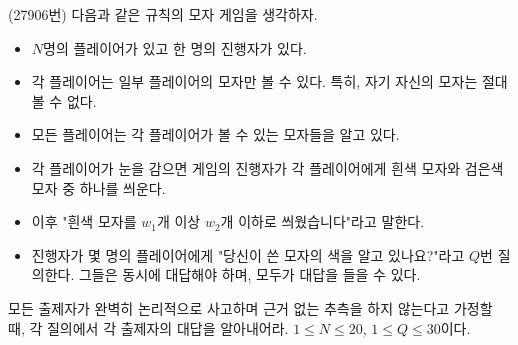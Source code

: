 \begin{problem}
    (27906번) 다음과 같은 규칙의 모자 게임을 생각하자.
    \begin{itemize}
        \item $N$명의 플레이어가 있고 한 명의 진행자가 있다. 
        \item 각 플레이어는 일부 플레이어의 모자만 볼 수 있다. 특히, 자기 자신의 모자는 절대 볼 수 없다.
        \item 모든 플레이어는 각 플레이어가 볼 수 있는 모자들을 알고 있다.
        \item 각 플레이어가 눈을 감으면 게임의 진행자가 각 플레이어에게 흰색 모자와 검은색 모자 중 하나를 씌운다.
        \item 이후 "흰색 모자를 $w_1$개 이상 $w_2$개 이하로 씌웠습니다"라고 말한다.
        \item 진행자가 몇 명의 플레이어에게 "당신이 쓴 모자의 색을 알고 있나요?"라고 $Q$번 질의한다. 그들은 동시에 대답해야 하며, 모두가 대답을 들을 수 있다.
    \end{itemize}
    모든 출제자가 완벽히 논리적으로 사고하며 근거 없는 추측을 하지 않는다고 가정할 때, 각 질의에서 각 출제자의 대답을 알아내어라. $1 \leq N \leq 20$, $1 \leq Q \leq 30$이다.
\end{problem}